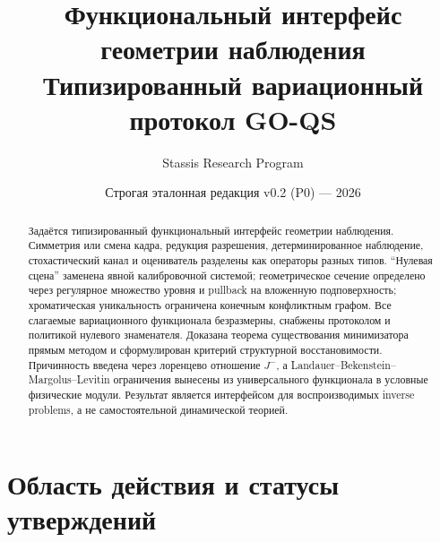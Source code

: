 \documentclass[11pt,a4paper]{article}
\title{\bfseries Функциональный интерфейс геометрии наблюдения\\
\large Типизированный вариационный протокол GO-QS}
\author{Stassis Research Program}
\date{Строгая эталонная редакция v0.2 (P0) --- 2026}
\theoremstyle{definition}
\theoremstyle{plain}
\theoremstyle{remark}
\begin{document}
\setlength{\RaggedRightParindent}{1.2em}
\RaggedRight
{}
\maketitle

\begin{center}
\end{center}

\begin{abstract}
Задаётся типизированный функциональный интерфейс геометрии наблюдения.
Симметрия или смена кадра, редукция разрешения,
де\-тер\-ми\-ни\-ро\-ван\-ное наблюдение,
стохастический канал и оцениватель разделены как операторы разных типов.
``Нулевая сцена'' заменена явной калибровочной системой; геометрическое
сечение определено через регулярное множество уровня и pullback на вложенную
подповерхность; хроматическая уникальность ограничена конечным конфликтным
графом. Все слагаемые вариационного функционала безразмерны, снабжены
протоколом и политикой нулевого знаменателя. Доказана теорема существования
минимизатора прямым методом и сформулирован критерий структурной
восстановимости. Причинность введена через лоренцево отношение $J^-$, а
Landauer--Bekenstein--Margolus--Levitin ограничения вынесены из универсального
функционала в условные физические модули. Результат является интерфейсом для
воспроизводимых inverse problems, а не самостоятельной динамической теорией.
\end{abstract}

\tableofcontents

\section{Область действия и статусы утверждений}
\end{document}

